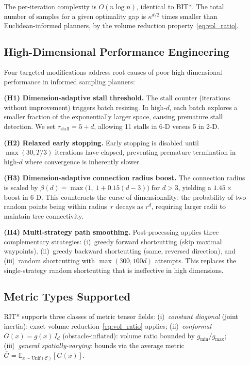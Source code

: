 \documentclass[journal]{IEEEtran}
\newcommand{\Cspace}{\mathcal{C}}
\begin{document}
The per-iteration complexity is $O(n \log n)$, identical to BIT*.
The total number of samples for a given optimality gap is
$\kappa^{d/2}$ times smaller than Euclidean-informed planners, by
the volume reduction property~\eqref{eq:vol_ratio}.

\subsection{High-Dimensional Performance Engineering}\label{sec:highd}

Four targeted modifications address root causes of poor
high-dimensional performance in informed sampling planners:

\textbf{(H1) Dimension-adaptive stall threshold.}
The stall counter (iterations without improvement) triggers batch
resizing. In high-$d$, each batch explores a smaller fraction of the
exponentially larger space, causing premature stall detection.
We set $\tau_{\mathrm{stall}} = 5 + d$, allowing 11 stalls in 6-D
versus 5 in 2-D.

\textbf{(H2) Relaxed early stopping.}
Early stopping is disabled until $\max(30, T/3)$ iterations have
elapsed, preventing premature termination in high-$d$ where convergence
is inherently slower.

\textbf{(H3) Dimension-adaptive connection radius boost.}
The connection radius is scaled by
$\beta(d) = \max\bigl(1,\; 1 + 0.15(d-3)\bigr)$ for $d > 3$,
yielding a $1.45\times$ boost in 6-D. This counteracts the curse of
dimensionality: the probability of two random points being within
radius~$r$ decays as $r^d$, requiring larger radii to maintain tree
connectivity.

\textbf{(H4) Multi-strategy path smoothing.}
Post-processing applies three complementary strategies:
(i)~greedy forward shortcutting (skip maximal waypoints),
(ii)~greedy backward shortcutting (same, reversed direction), and
(iii)~random shortcutting with $\max(300, 100 d)$ attempts. This
replaces the single-strategy random shortcutting that is ineffective
in high dimensions.

\subsection{Metric Types Supported}

RIT* supports three classes of metric tensor fields:
(i)~\emph{constant diagonal} (joint inertia): exact volume
reduction~\eqref{eq:vol_ratio} applies;
(ii)~\emph{conformal} $G(x) = g(x)\, I_d$ (obstacle-inflated):
volume ratio bounded by $g_{\min}/g_{\max}$;
(iii)~\emph{general spatially-varying}: bounds via the average
metric $\bar{G} = \mathbb{E}_{x \sim \mathrm{Unif}(\Cspace)}[G(x)]$.
\end{document}
